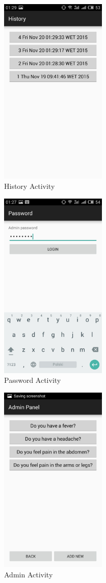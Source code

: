 \documentclass[conference]{IEEEtran}
\begin{document}
\begin{figure}[p!]
  \centering
      \includegraphics[width=2.0in]{./../img/history.jpg}
  \caption{History Activity}
  \label{history-ss}
\end{figure}

\begin{figure}[p!]
  \centering
      \includegraphics[width=2.0in]{./../img/password.jpg}
  \caption{Password Activity}
  \label{password-ss}
\end{figure}

\begin{figure}[p!]
  \centering
      \includegraphics[width=2.0in]{./../img/questions.jpg}
  \caption{Admin Activity}
  \label{questions-ss}
\end{figure}
\end{document}
